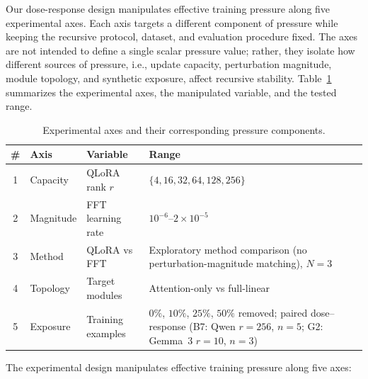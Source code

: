 \documentclass[a4paper,fleqn]{cas-dc}
\newif\ifshowchanges
\newcommand{\rev}[1]{\ifshowchanges{\color{blue}#1}\else{#1}\fi}
\begin{document}
Our dose-response design manipulates effective training pressure along five
experimental axes. Each axis targets a different component of pressure while
keeping the recursive protocol, dataset, and evaluation procedure fixed. The
axes are not intended to define a single scalar pressure value; rather, they
isolate how different sources of pressure, i.e., update capacity, perturbation
magnitude, module topology, and synthetic exposure, affect recursive stability.
Table~\ref{tab:axes} summarizes the experimental axes, the manipulated variable,
and the tested range.

\begin{table}[!htbp]
\caption{Experimental axes and their corresponding pressure
components.}\label{tab:axes}
\footnotesize
\begin{tabular}{@{}c l >{\raggedright}p{2.2cm} >{\raggedright\arraybackslash}p{4.6cm}@{}}
\toprule
\textbf{\#} & \textbf{Axis} & \textbf{Variable} & \textbf{Range} \\
\midrule
1 & Capacity & QLoRA rank $r$ & $\{4, 16, 32, 64, 128, 256\}$ \\[2pt]
2 & Magnitude & FFT learning rate & $10^{-6}$--$2{\times}10^{-5}$ \\[2pt]
3 & Method & QLoRA vs FFT & \rev{Exploratory method comparison (no perturbation-magnitude matching)}, $N{=}3$ \\[2pt]
4 & Topology & Target modules & Attention-only vs full-linear \\[2pt]
5 & Exposure & Training examples & \rev{$0\%$, $10\%$, $25\%$, $50\%$ removed;
  paired dose--response (B7: Qwen $r{=}256$, $n{=}5$; G2: Gemma~3 $r{=}10$, $n{=}3$)} \\
\bottomrule
\end{tabular}
\end{table}

The experimental design manipulates effective training pressure along five axes:
\end{document}
